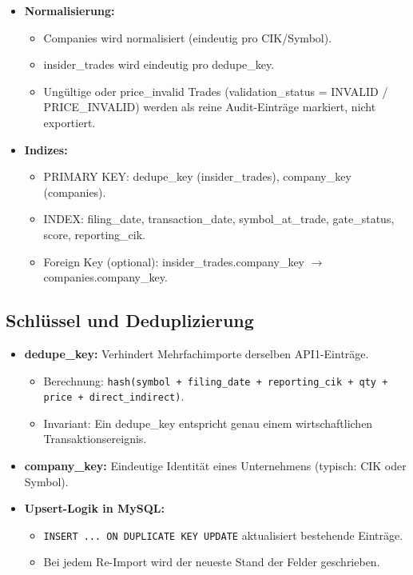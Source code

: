 \begin{itemize}
\begin{itemize}
        \begin{itemize}
          \item Gate-Schwellen, Score-Schwellen, Import-Intervalle.
        \end{itemize}
    \end{itemize}
  \item \textbf{Normalisierung:}
    \begin{itemize}
      \item Companies wird normalisiert (eindeutig pro CIK/Symbol).
      \item insider\_trades wird eindeutig pro dedupe\_key.
      \item Ungültige oder price\_invalid Trades (validation\_status = INVALID / PRICE\_INVALID) werden als reine Audit-Einträge markiert, nicht exportiert. %
    \end{itemize}
  \item \textbf{Indizes:}
    \begin{itemize}
      \item PRIMARY KEY: dedupe\_key (insider\_trades), company\_key (companies). %
      \item INDEX: filing\_date, transaction\_date, symbol\_at\_trade, gate\_status, score, reporting\_cik.
      \item Foreign Key (optional): insider\_trades.company\_key $\rightarrow$ companies.company\_key. %
    \end{itemize}
\end{itemize}

\subsection{Schlüssel und Deduplizierung}
\begin{itemize}
  \item \textbf{dedupe\_key:} Verhindert Mehrfachimporte derselben API1-Einträge. %
    \begin{itemize}
      \item Berechnung: \texttt{hash(symbol + filing\_date + reporting\_cik + qty + price + direct\_indirect)}.
      \item Invariant: Ein dedupe\_key entspricht genau einem wirtschaftlichen Transaktionsereignis.
    \end{itemize}
  \item \textbf{company\_key:} Eindeutige Identität eines Unternehmens (typisch: CIK oder Symbol). %
  \item \textbf{Upsert-Logik in MySQL:} %
    \begin{itemize}
      \item \texttt{INSERT ... ON DUPLICATE KEY UPDATE} aktualisiert bestehende Einträge.
      \item Bei jedem Re-Import wird der neueste Stand der Felder geschrieben.
    \end{itemize}
\end{itemize}

